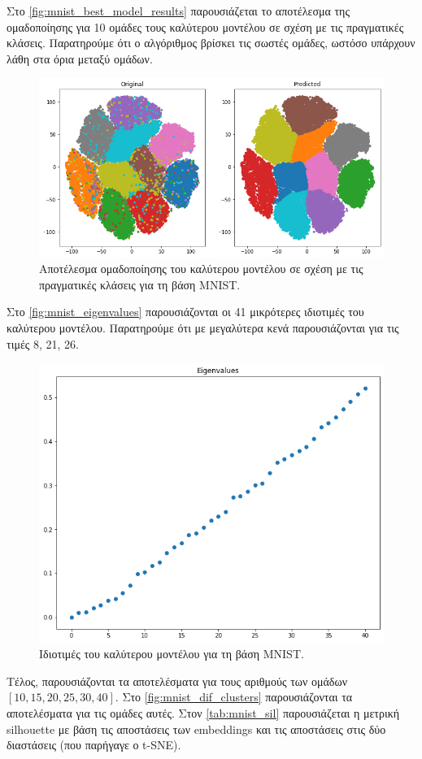 \documentclass[a4paper]{article}
\begin{document}
Στο \autoref{fig:mnist_best_model_results} παρουσιάζεται το αποτέλεσμα της
ομαδοποίησης για 10 ομάδες τους καλύτερου μοντέλου σε σχέση με τις πραγματικές
κλάσεις. Παρατηρούμε ότι ο αλγόριθμος βρίσκει τις σωστές ομάδες, ωστόσο υπάρχουν
λάθη στα όρια μεταξύ ομάδων.

\begin{figure}[H]
    \centering
    \includegraphics[width=0.6\linewidth]{mnist/best_model_results.png}
    \caption{Αποτέλεσμα ομαδοποίησης του καλύτερου μοντέλου σε σχέση με τις
    πραγματικές κλάσεις για τη βάση MNIST.}
    \label{fig:mnist_best_model_results}
\end{figure}

Στο \autoref{fig:mnist_eigenvalues} παρουσιάζονται οι 41 μικρότερες ιδιοτιμές
του καλύτερου μοντέλου. Παρατηρούμε ότι με μεγαλύτερα κενά παρουσιάζονται για
τις τιμές 8, 21, 26.

\begin{figure}[H]
    \centering
    \includegraphics[width=0.6\linewidth]{mnist/eigenvalues.png}
    \caption{Ιδιοτιμές του καλύτερου μοντέλου για τη βάση MNIST.}
    \label{fig:mnist_eigenvalues}
\end{figure}

Τέλος, παρουσιάζονται τα αποτελέσματα για τους αριθμούς των ομάδων $[10, 15, 20,
25, 30, 40]$. Στο \autoref{fig:mnist_dif_clusters} παρουσιάζονται τα
αποτελέσματα για τις ομάδες αυτές. Στον \autoref{tab:mnist_sil} παρουσιάζεται η
μετρική silhouette με βάση τις αποστάσεις των embeddings και τις αποστάσεις στις
δύο διαστάσεις (που παρήγαγε ο t-SNE).
\end{document}
